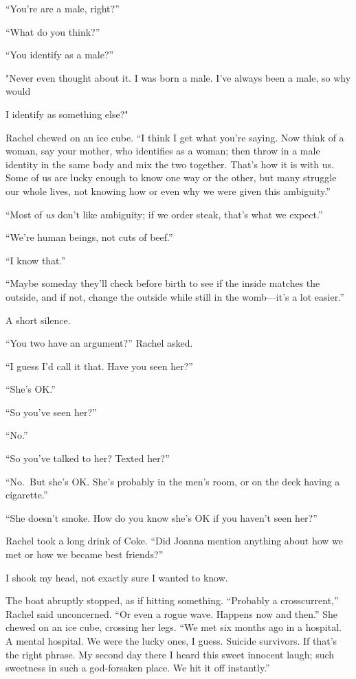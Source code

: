 ``You're are a male, right?''

``What do you think?''

``You identify as a male?''

"Never even thought about it. I was born a male. I've always been a
male, so why would

I identify as something else?"

Rachel chewed on an ice cube. ``I think I get what you're saying. Now
think of a woman, say your mother, who identifies as a woman; then throw
in a male identity in the same body and mix the two together. That's how
it is with us. Some of us are lucky enough to know one way or the other,
but many struggle our whole lives, not knowing how or even why we were
given this ambiguity.''

``Most of \emph{us} don't like ambiguity; if we order steak, that's what
we expect.''

``We're human beings, not cuts of beef.''

``I know that.''

``Maybe someday they'll check before birth to see if the inside matches
the outside, and if not, change the outside while still in the
womb---it's a lot easier.''

A short silence.

``You two have an argument?'' Rachel asked.

``I guess I'd call it that. Have you seen her?''

``She's OK.''

``So you've seen her?''

``No.''

``So you've talked to her? Texted her?''

``No.~But she's OK. She's probably in the men's room, or on the deck
having a cigarette.''

``She doesn't smoke. How do you know she's OK if you haven't seen her?''

Rachel took a long drink of Coke. ``Did Joanna mention anything about
how we met or how we became best friends?''

I shook my head, not exactly sure I wanted to know.

The boat abruptly stopped, as if hitting something. ``Probably a
crosscurrent,'' Rachel said unconcerned. ``Or even a rogue wave. Happens
now and then.'' She chewed on an ice cube, crossing her legs. ``We met
six months ago in a hospital. A mental hospital. We were the lucky ones,
I guess. Suicide survivors. If that's the right phrase. My second day
there I heard this sweet innocent laugh; such sweetness in such a
god-forsaken place. We hit it off instantly.''

